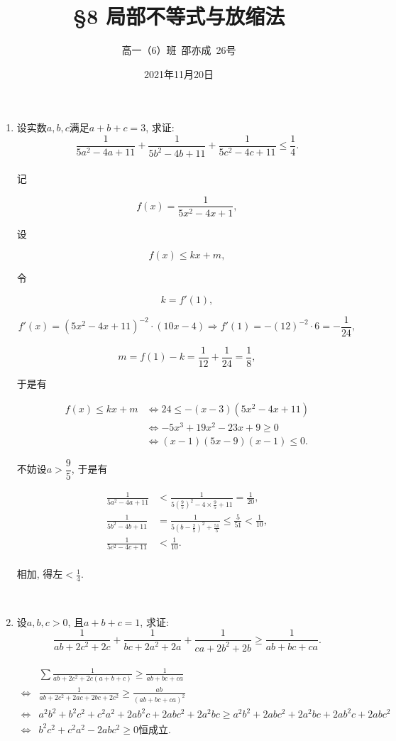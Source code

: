 \documentclass[8pt]{article}
\title{\S 8 局部不等式与放缩法}
\author{高一（6）班\ 邵亦成\ 26号}
\date{2021年11月20日}
\begin{document}
	\maketitle

	\begin{enumerate}
		\item 设实数$a, b, c$满足$a+b+c=3$, 求证: $$\frac{1}{5a^2-4a+11}+\frac{1}{5b^2-4b+11}+\frac{1}{5c^2-4c+11}\leq\frac{1}{4}.$$
			~\\

			记

			$$f(x)=\frac{1}{5x^2-4x+1},$$

			设

			$$f(x)\leq kx+m,$$

			令

			$$k=f'(1),$$

			$$f'(x)=(5x^2-4x+11)^{-2}\cdot (10x-4) \Rightarrow f'(1)=-(12)^{-2}\cdot 6=-\frac{1}{24},$$

			$$m=f(1)-k=\frac{1}{12}+\frac{1}{24}=\frac{1}{8},$$

			于是有

			\begin{align*}
			f(x)\leq kx+m & \Leftrightarrow 24\leq -(x-3)(5x^2-4x+11)\\
			& \Leftrightarrow -5x^3+19x^2-23x+9\geq 0\\
			& \Leftrightarrow (x-1)(5x-9)(x-1)\leq 0.
			\end{align*}

			不妨设$a>\dfrac{9}{5}$, 于是有

			\begin{align*}
			\frac{1}{5a^2-4a+11} &< \frac{1}{5\left(\frac{9}{5}\right)^2-4\times \frac{9}{5}+11}=\frac{1}{20},\\
			\frac{1}{5b^2-4b+11} &= \frac{1}{5\left(b-\frac{2}{5}\right)^2+\frac{51}{5}}\leq \frac{5}{51}<\frac{1}{10},\\
			\frac{1}{5c^2-4c+11} &<\frac{1}{10}.\\
			\end{align*}

			相加, 得$\text{左}<\frac{1}{4}$.

		~\\

		\item 设$a, b, c>0$, 且$a+b+c=1$, 求证: $$\frac{1}{ab+2c^2+2c}+\frac{1}{bc+2a^2+2a}+\frac{1}{ca+2b^2+2b}\geq\frac{1}{ab+bc+ca}.$$
			~\\

			\begin{align*}
				& \sum \frac{1}{ab+2c^2+2c(a+b+c)} \geq \frac{1}{ab+bc+ca}\\
				\Leftrightarrow & \frac{1}{ab+2c^2+2ac+2bc+2c^2} \geq \frac{ab}{(ab+bc+ca)^2}\\
				\Leftrightarrow & a^2 b^2 + b^2 c^2 + c^2 a^2 + 2ab^2 c + 2abc^2 + 2a^2 bc \geq a^2 b^2 + 2abc^2 + 2a^2 bc+2ab^2 c+2abc^2 \\
				\Leftrightarrow & b^2 c^2 + c^2 a^2 - 2abc^2 \geq 0 \text{恒成立.}\\
			\end{align*}


\end{enumerate}
\end{document}
